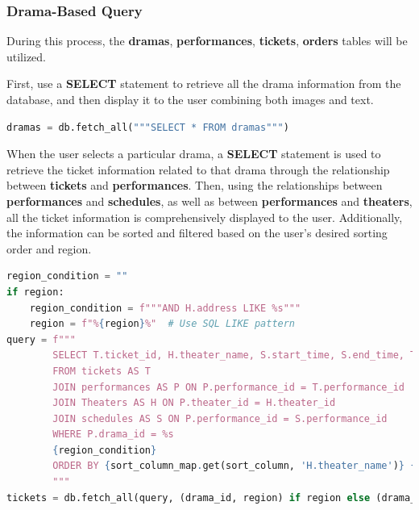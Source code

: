 \documentclass[12pt]{article}
\begin{document}
\subsubsection{Drama-Based Query}
\par During this process, the \textbf{dramas}, \textbf{performances}, \textbf{tickets}, \textbf{orders} tables will be utilized. 
\par First, use a \textbf{SELECT} statement to retrieve all the drama information from the database, and then display it to the user combining both images and text.
\begin{tcolorbox}[colframe=black, colback=white, boxrule=0.4mm, sharp corners=southwest, title=Excerpt of Search Dramas Code]
    \begin{lstlisting}[language=Python, breaklines=true]
dramas = db.fetch_all("""SELECT * FROM dramas""")
\end{lstlisting}
\end{tcolorbox}

\par When the user selects a particular drama, a \textbf{SELECT} statement is used to retrieve the ticket information related to that drama through the relationship between \textbf{tickets} and \textbf{performances}. Then, using the relationships between \textbf{performances} and \textbf{schedules}, as well as between \textbf{performances} and \textbf{theaters}, all the ticket information is comprehensively displayed to the user. Additionally, the information can be sorted and filtered based on the user's desired sorting order and region.
\begin{tcolorbox}[colframe=black, colback=white, boxrule=0.4mm, sharp corners=southwest, title=Excerpt of Search Tickets Code]
    \begin{lstlisting}[language=Python, breaklines=true]
region_condition = ""
if region:
    region_condition = f"""AND H.address LIKE %s"""
    region = f"%{region}%"  # Use SQL LIKE pattern
query = f"""
        SELECT T.ticket_id, H.theater_name, S.start_time, S.end_time, T.class, T.price, T.left_tickets
        FROM tickets AS T
        JOIN performances AS P ON P.performance_id = T.performance_id
        JOIN Theaters AS H ON P.theater_id = H.theater_id
        JOIN schedules AS S ON P.performance_id = S.performance_id
        WHERE P.drama_id = %s
        {region_condition}
        ORDER BY {sort_column_map.get(sort_column, 'H.theater_name')} {sort_order_sql}
        """
tickets = db.fetch_all(query, (drama_id, region) if region else (drama_id,))
\end{lstlisting}
\end{tcolorbox}
\end{document}
